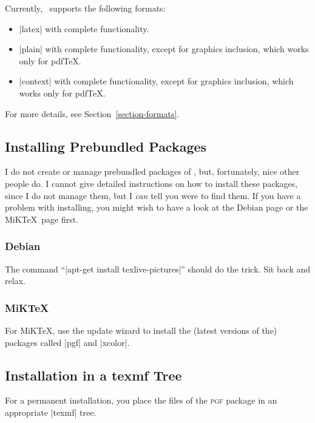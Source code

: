 Currently, \pgfname\ supports the following formats:
%
\begin{itemize}
    \item |latex| with complete functionality.
    \item |plain| with complete functionality, except for graphics inclusion,
        which works only for pdf\TeX.
    \item |context| with complete functionality, except for graphics
        inclusion, which works only for pdf\TeX.
\end{itemize}

For more details, see Section~\ref{section-formats}.


\subsection{Installing Prebundled Packages}

I do not create or manage prebundled packages of \pgfname, but, fortunately,
nice other people do. I cannot give detailed instructions on how to install
these packages, since I do not manage them, but I \emph{can} tell you were to
find them. If you have a problem with installing, you might wish to have a look
at the Debian page or the MiK\TeX\ page first.


\subsubsection{Debian}

The command ``|apt-get install texlive-pictures|'' should do the trick.
Sit back and relax.


\subsubsection{MiKTeX}

For MiK\TeX, use the update wizard to install the (latest versions of the)
packages called |pgf| and |xcolor|.


\subsection{Installation in a texmf Tree}

For a permanent installation, you place the files of the \textsc{pgf} package
in an appropriate |texmf| tree.

